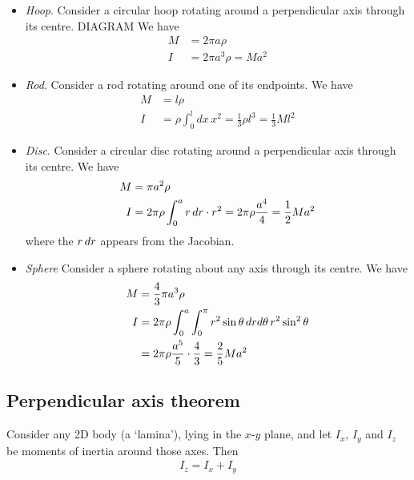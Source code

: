 \documentclass{../../template/note}
\begin{document}
    \begin{example*}
        \begin{itemize}
            \item \emph{Hoop}. Consider a circular hoop rotating around a perpendicular axis through its centre. DIAGRAM We have
            \begin{align*}
                M &= 2\pi a \rho \\
                I &= 2\pi a^3 \rho = Ma^2
            \end{align*}
            \item \emph{Rod}. Consider a rod rotating around one of its endpoints. We have
            \begin{align*}
                M &= l\rho \\
                I &= \rho \int_0^l dx \, x^2 = \frac 1 3 \rho l^3 = \frac 1 3 M l^2
            \end{align*}
            \item \emph{Disc}. Consider a circular disc rotating around a perpendicular axis through its centre. We have
            \begin{align*}
                M &= \pi a^2 \rho \\
                I &= 2\pi \rho \int_0^a r \,d{r} \cdot r^2 = 2\pi \rho \frac{a^4}{4} = \frac 1 2 Ma^2
            \end{align*}
            where the \(r \,d{r}\) appears from the Jacobian.
            \item \emph{Sphere} Consider a sphere rotating about any axis through its centre. We have
            \begin{align*}
                M &= \frac 4 3 \pi a^3 \rho \\
                I &= 2 \pi \rho \int_0^a \int_0^\pi r^2 \sin \theta \,d{r} d \theta \, r^2 \sin^2 \theta \\
                &= 2\pi \rho \frac{a^5}{5} \cdot \frac 4 3 = \frac 2 5 Ma^2
            \end{align*}
        \end{itemize}
    \end{example*}
    
    \subsection{Perpendicular axis theorem}
    
    \begin{proposition}
        Consider any 2D body (a `lamina'), lying in the \(x\)-\(y\) plane, and let \(I_x\), \(I_y\) and \(I_z\) be moments of inertia around those axes. Then
        \begin{align*}
            I_z = I_x + I_y
        \end{align*}
    \end{proposition}
    
\end{document}
